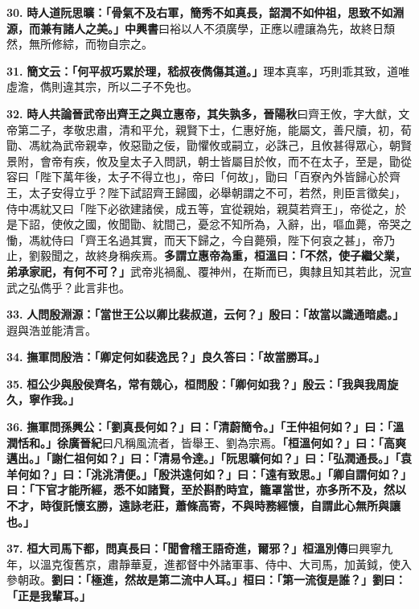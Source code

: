 \textbf{30.} \textbf{時人道阮思曠：「骨氣不及右軍，簡秀不如真長，韶潤不如仲祖，思致不如淵源，而兼有諸人之美。」}{\footnotesize \textbf{中興書}曰裕以人不須廣學，正應以禮讓為先，故終日頹然，無所修綜，而物自宗之。}

\textbf{31.} \textbf{簡文云：「何平叔巧累於理，嵇叔夜儁傷其道。」}{\footnotesize 理本真率，巧則乖其致，道唯虛澹，儁則違其宗，所以二子不免也。}

\textbf{32.} \textbf{時人共論晉武帝出齊王之與立惠帝，其失孰多，}{\footnotesize \textbf{晉陽秋}曰齊王攸，字大猷，文帝第二子，孝敬忠肅，清和平允，親賢下士，仁惠好施，能屬文，善尺牘，初，荀勖、馮紞為武帝親幸，攸惡勖之佞，勖懼攸或嗣立，必誅己，且攸甚得眾心，朝賢景附，會帝有疾，攸及皇太子入問訊，朝士皆屬目於攸，而不在太子，至是，勖從容曰「陛下萬年後，太子不得立也」，帝曰「何故」，勖曰「百寮內外皆歸心於齊王，太子安得立乎？陛下試詔齊王歸國，必舉朝謂之不可，若然，則臣言徵矣」，侍中馮紞又曰「陛下必欲建諸侯，成五等，宜從親始，親莫若齊王」，帝從之，於是下詔，使攸之國，攸聞勖、紞間己，憂忿不知所為，入辭，出，嘔血薨，帝哭之慟，馮紞侍曰「齊王名過其實，而天下歸之，今自薨殞，陛下何哀之甚」，帝乃止，劉毅聞之，故終身稱疾焉。}\textbf{多謂立惠帝為重，桓溫曰：「不然，使子繼父業，弟承家祀，有何不可？」}{\footnotesize 武帝兆禍亂、覆神州，在斯而已，輿隸且知其若此，況宣武之弘儁乎？此言非也。}

\textbf{33.} \textbf{人問殷淵源：「當世王公以卿比裴叔道，云何？」殷曰：「故當以識通暗處。」}{\footnotesize 遐與浩並能清言。}

\textbf{34.} \textbf{撫軍問殷浩：「卿定何如裴逸民？」良久答曰：「故當勝耳。」}

\textbf{35.} \textbf{桓公少與殷侯齊名，常有競心，桓問殷：「卿何如我？」殷云：「我與我周旋久，寧作我。」}

\textbf{36.} \textbf{撫軍問孫興公：「劉真長何如？」曰：「清蔚簡令。」「王仲祖何如？」曰：「溫潤恬和。」}{\footnotesize \textbf{徐廣晉紀}曰凡稱風流者，皆舉王、劉為宗焉。}\textbf{「桓溫何如？」曰：「高爽邁出。」「謝仁祖何如？」曰：「清易令達。」「阮思曠何如？」曰：「弘潤通長。」「袁羊何如？」曰：「洮洮清便。」「殷洪遠何如？」曰：「遠有致思。」「卿自謂何如？」曰：「下官才能所經，悉不如諸賢，至於斟酌時宜，籠罩當世，亦多所不及，然以不才，時復託懷玄勝，遠詠老莊，蕭條高寄，不與時務經懷，自謂此心無所與讓也。」}

\textbf{37.} \textbf{桓大司馬下都，問真長曰：「聞會稽王語奇進，爾邪？」}{\footnotesize \textbf{桓溫別傳}曰興寧九年，以溫克復舊京，肅靜華夏，進都督中外諸軍事、侍中、大司馬，加黃鉞，使入參朝政。}\textbf{劉曰：「極進，然故是第二流中人耳。」桓曰：「第一流復是誰？」劉曰：「正是我輩耳。」}

